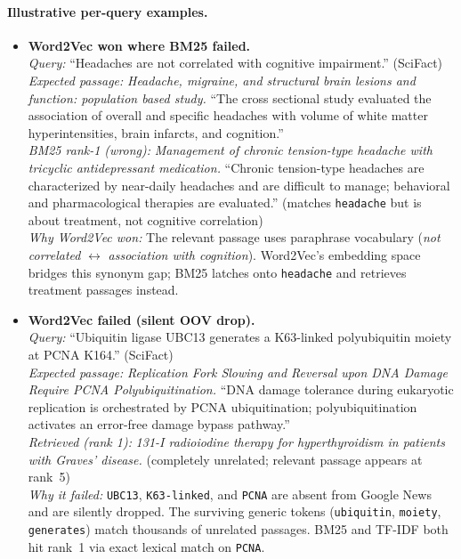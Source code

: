 \documentclass[12pt, a4paper]{article}
\newcommand{\scifact}{SciFact}
\begin{document}
\paragraph{Illustrative per-query examples.}
\begin{itemize}

\item \textbf{Word2Vec won where BM25 failed.}\\
  \textit{Query:} ``Headaches are not correlated with cognitive impairment.'' (\scifact{})\\
  \textit{Expected passage:} \textit{Headache, migraine, and structural brain lesions and
    function: population based study.} ``The cross sectional study evaluated the association
    of overall and specific headaches with volume of white matter hyperintensities, brain
    infarcts, and cognition.''\\
  \textit{BM25 rank-1 (wrong):} \textit{Management of chronic tension-type headache with
    tricyclic antidepressant medication.} ``Chronic tension-type headaches are characterized
    by near-daily headaches and are difficult to manage; behavioral and pharmacological
    therapies are evaluated.'' (matches \texttt{headache} but is about treatment, not
    cognitive correlation)\\
  \textit{Why Word2Vec won:} The relevant passage uses paraphrase vocabulary
    (\textit{not correlated} $\leftrightarrow$ \textit{association with cognition}).
    Word2Vec's embedding space bridges this synonym gap; BM25 latches onto
    \texttt{headache} and retrieves treatment passages instead.

\item \textbf{Word2Vec failed (silent OOV drop).}\\
  \textit{Query:} ``Ubiquitin ligase UBC13 generates a K63-linked polyubiquitin moiety at
    PCNA K164.'' (\scifact{})\\
  \textit{Expected passage:} \textit{Replication Fork Slowing and Reversal upon DNA Damage
    Require PCNA Polyubiquitination.} ``DNA damage tolerance during eukaryotic replication
    is orchestrated by PCNA ubiquitination; polyubiquitination activates an error-free
    damage bypass pathway.''\\
  \textit{Retrieved (rank 1):} \textit{131-I radioiodine therapy for hyperthyroidism in
    patients with Graves' disease.} (completely unrelated; relevant passage appears at
    rank~5)\\
  \textit{Why it failed:} \texttt{UBC13}, \texttt{K63-linked}, and \texttt{PCNA} are absent
    from Google News and are silently dropped.  The surviving generic tokens
    (\texttt{ubiquitin}, \texttt{moiety}, \texttt{generates}) match thousands of unrelated
    passages.  BM25 and TF-IDF both hit rank~1 via exact lexical match on \texttt{PCNA}.

\end{itemize}
\end{document}
